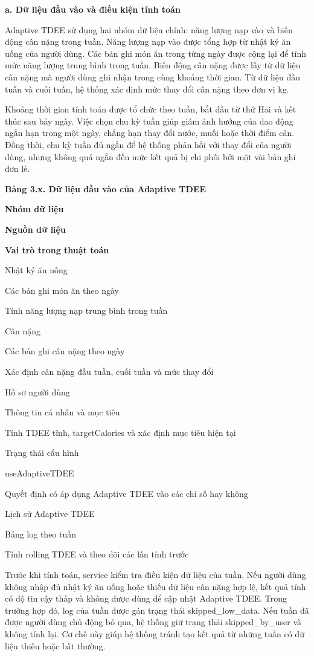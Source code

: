 \textbf{a. Dữ liệu đầu vào và điều kiện tính toán}

Adaptive TDEE sử dụng hai nhóm dữ liệu chính: năng lượng nạp vào và biến động cân nặng trong tuần. Năng lượng nạp vào được tổng hợp từ nhật ký ăn uống của người dùng. Các bản ghi món ăn trong từng ngày được cộng lại để tính mức năng lượng trung bình trong tuần. Biến động cân nặng được lấy từ dữ liệu cân nặng mà người dùng ghi nhận trong cùng khoảng thời gian. Từ dữ liệu đầu tuần và cuối tuần, hệ thống xác định mức thay đổi cân nặng theo đơn vị kg.

Khoảng thời gian tính toán được tổ chức theo tuần, bắt đầu từ thứ Hai và kết thúc sau bảy ngày. Việc chọn chu kỳ tuần giúp giảm ảnh hưởng của dao động ngắn hạn trong một ngày, chẳng hạn thay đổi nước, muối hoặc thời điểm cân. Đồng thời, chu kỳ tuần đủ ngắn để hệ thống phản hồi với thay đổi của người dùng, nhưng không quá ngắn đến mức kết quả bị chi phối bởi một vài bản ghi đơn lẻ.

\textbf{Bảng 3.x. Dữ liệu đầu vào của Adaptive TDEE}

\textbf{Nhóm dữ liệu}

\textbf{Nguồn dữ liệu}

\textbf{Vai trò trong thuật toán}

Nhật ký ăn uống

Các bản ghi món ăn theo ngày

Tính năng lượng nạp trung bình trong tuần

Cân nặng

Các bản ghi cân nặng theo ngày

Xác định cân nặng đầu tuần, cuối tuần và mức thay đổi

Hồ sơ người dùng

Thông tin cá nhân và mục tiêu

Tính TDEE tĩnh, targetCalories và xác định mục tiêu hiện tại

Trạng thái cấu hình

useAdaptiveTDEE

Quyết định có áp dụng Adaptive TDEE vào các chỉ số hay không

Lịch sử Adaptive TDEE

Bảng log theo tuần

Tính rolling TDEE và theo dõi các lần tính trước

Trước khi tính toán, service kiểm tra điều kiện dữ liệu của tuần. Nếu người dùng không nhập đủ nhật ký ăn uống hoặc thiếu dữ liệu cân nặng hợp lệ, kết quả tính có độ tin cậy thấp và không được dùng để cập nhật Adaptive TDEE. Trong trường hợp đó, log của tuần được gán trạng thái skipped\_low\_data. Nếu tuần đã được người dùng chủ động bỏ qua, hệ thống giữ trạng thái skipped\_by\_user và không tính lại. Cơ chế này giúp hệ thống tránh tạo kết quả từ những tuần có dữ liệu thiếu hoặc bất thường.

